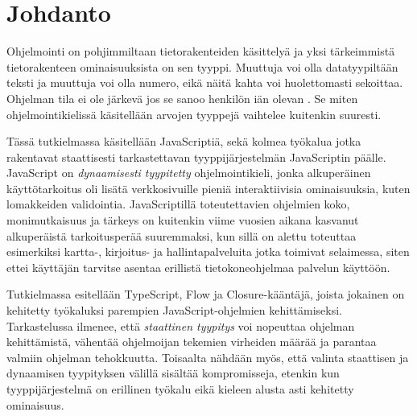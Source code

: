 \chapter{Johdanto} \label{Johdanto}

Ohjelmointi on pohjimmiltaan tietorakenteiden käsittelyä ja yksi tärkeimmistä
tietorakenteen ominaisuuksista on sen tyyppi. Muuttuja  voi olla
datatyypiltään teksti ja muuttuja  voi olla numero, eikä näitä kahta voi
huolettomasti sekoittaa. Ohjelman tila ei ole järkevä jos se sanoo henkilön
iän olevan . Se miten ohjelmointikielissä käsitellään arvojen tyyppejä
vaihtelee kuitenkin suuresti.

Tässä tutkielmassa käsitellään JavaScriptiä, sekä kolmea työkalua jotka
rakentavat staattisesti tarkastettavan tyyppijärjestelmän
JavaScriptin päälle. JavaScript on \textit{dynaamisesti tyypitetty} ohjelmointikieli,
jonka alkuperäinen käyttötarkoitus oli lisätä verkkosivuille pieniä
interaktiivisia ominaisuuksia, kuten lomakkeiden validointia. JavaScriptillä
toteutettavien ohjelmien koko, monimutkaisuus ja tärkeys on kuitenkin viime
vuosien aikana kasvanut alkuperäistä tarkoitusperää suuremmaksi, kun sillä on
alettu toteuttaa esimerkiksi kartta-, kirjoitus- ja hallintapalveluita jotka
toimivat selaimessa, siten ettei käyttäjän tarvitse asentaa erillistä
tietokoneohjelmaa palvelun käyttöön.

Tutkielmassa esitellään TypeScript, Flow ja Closure-kääntäjä, joista jokainen on
kehitetty työkaluksi parempien JavaScript-ohjelmien kehittämiseksi.
Tarkastelussa ilmenee, että \textit{staattinen tyypitys} voi nopeuttaa ohjelman
kehittämistä, vähentää ohjelmoijan tekemien virheiden määrää ja parantaa
valmiin ohjelman tehokkuutta. Toisaalta nähdään myös, että valinta staattisen
ja dynaamisen tyypityksen välillä sisältää kompromisseja, etenkin kun
tyyppijärjestelmä on erillinen työkalu eikä kieleen alusta asti kehitetty
ominaisuus.
